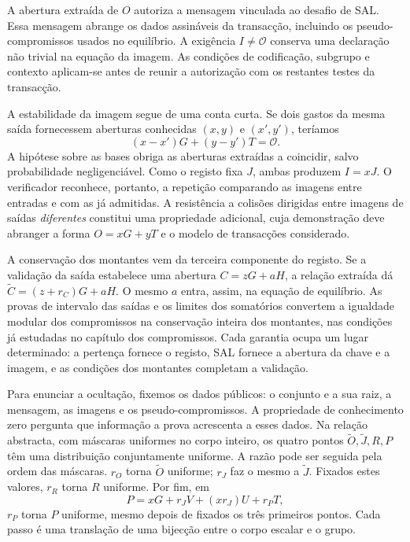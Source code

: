 
A abertura extraída de \(O\) autoriza a mensagem vinculada
ao desafio de SAL. Essa mensagem abrange os dados assináveis
da transacção, incluindo os pseudo-compromissos usados no
equilíbrio. A exigência \(I\ne\mathcal O\) conserva uma
declaração não trivial na equação da imagem. As condições
de codificação, subgrupo e contexto aplicam-se antes de
reunir a autorização com os restantes testes da transacção.

A estabilidade da imagem segue de uma conta curta. Se dois
gastos da mesma saída fornecessem aberturas conhecidas
\((x,y)\) e \((x',y')\), teríamos
\[
 (x-x')G+(y-y')T=\mathcal O.
\]
A hipótese sobre as bases obriga as aberturas extraídas
a coincidir, salvo probabilidade negligenciável. Como o
registo fixa \(J\), ambas produzem \(I=xJ\).
O verificador reconhece, portanto, a repetição comparando
as imagens entre entradas e com as já admitidas. A
resistência a colisões dirigidas entre imagens de saídas
\emph{diferentes} constitui uma propriedade adicional,
cuja demonstração deve abranger a forma \(O=xG+yT\)
e o modelo de transacções considerado.

A conservação dos montantes vem da terceira componente
do registo. Se a validação da saída estabelece uma
abertura \(C=zG+aH\), a relação extraída dá
\(\widetilde C=(z+r_C)G+aH\). O mesmo \(a\) entra,
assim, na equação de equilíbrio. As provas de intervalo
das saídas e os limites dos somatórios convertem a
igualdade modular dos compromissos na conservação inteira
dos montantes, nas condições já estudadas no capítulo
dos compromissos. Cada garantia ocupa um lugar determinado:
a pertença fornece o registo, SAL fornece a abertura da
chave e a imagem, e as condições dos montantes completam
a validação.

Para enunciar a ocultação, fixemos os dados públicos:
o conjunto e a sua raiz, a mensagem, as imagens e os
pseudo-compromissos. A propriedade de conhecimento zero
pergunta que informação a prova acrescenta a esses dados.
Na relação abstracta, com máscaras uniformes no corpo
inteiro, os quatro pontos
\(\widetilde O,\widetilde J,R,P\) têm uma distribuição
conjuntamente uniforme. A razão pode ser seguida pela
ordem das máscaras. \(r_O\) torna \(\widetilde O\)
uniforme; \(r_J\) faz o mesmo a \(\widetilde J\).
Fixados estes valores, \(r_R\) torna \(R\) uniforme.
Por fim, em
\[
 P=xG+r_JV+(xr_J)U+r_PT,
\]
\(r_P\) torna \(P\) uniforme, mesmo depois de fixados
os três primeiros pontos. Cada passo é uma translação
de uma bijecção entre o corpo escalar e o grupo.

